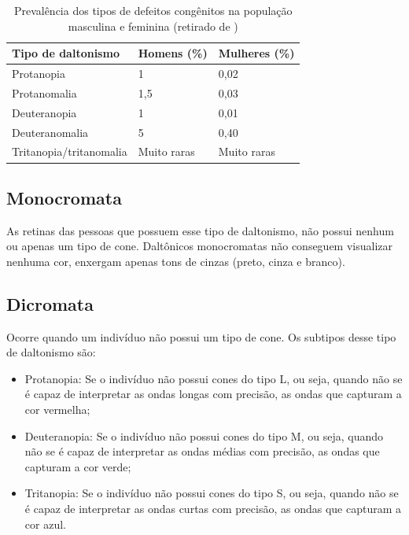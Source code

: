 \documentclass[	12pt, Times, openright, twoside, a4paper, english, brazil]{abntex2}
\begin{document}
\begin{table}[ht]
\centering
\begin{tabular}{|L{10em} |C{6em} |C{6em}|}
\hline      

\textbf{Tipo de daltonismo} & \textbf{Homens (\%)}  & \textbf{Mulheres (\%)}      \\ \hline
Protanopia                  & 1            & 0,02               \\ \hline
Protanomalia                & 1,5          & 0,03               \\ \hline
Deuteranopia                & 1            & 0,01               \\ \hline
Deuteranomalia              & 5            & 0,40               \\ \hline
Tritanopia/tritanomalia     & Muito raras  & Muito raras        \\ \hline
\end{tabular}
\caption{Prevalência dos tipos de defeitos congênitos na população masculina e feminina (retirado de )}
\label{tab:probabilidadeDaltonismo}
\end{table}


\subsection{Monocromata}

As retinas das pessoas que possuem esse tipo de daltonismo, não possui nenhum ou apenas um tipo de cone. Daltônicos monocromatas não conseguem visualizar nenhuma cor, enxergam apenas tons de cinzas (preto, cinza e branco).

\subsection{Dicromata}
Ocorre quando um indivíduo não possui um tipo de cone. Os subtipos desse tipo de daltonismo são:

\begin{itemize}
\item Protanopia: Se o indivíduo não possui cones do tipo L, ou seja, quando não se é capaz de interpretar as ondas longas com precisão, as ondas que capturam a cor vermelha;
\item Deuteranopia: Se o indivíduo não possui cones do tipo M, ou seja, quando não se é capaz de interpretar as ondas médias com precisão, as ondas que capturam a cor verde;
\item Tritanopia: Se o indivíduo não possui cones do tipo S, ou seja, quando não se é capaz de interpretar as ondas curtas com precisão, as ondas que capturam a cor azul.
\end{itemize}
\end{document}
